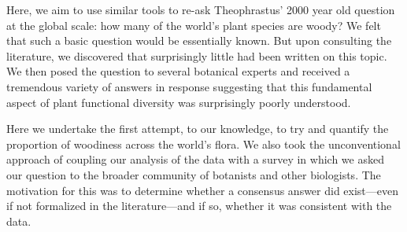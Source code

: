 \documentclass[12pt]{article}
\begin{document}
% 
Here, we aim to use similar tools to re-ask Theophrastus' 2000 year
old question at the global scale: how many of the world's plant
species are woody?
% 
We felt that such a basic question would be essentially known.  But
upon consulting the literature, we discovered that surprisingly little
had been written on this topic. We then posed the question to several
botanical experts and received a tremendous variety of answers in
response suggesting that this fundamental aspect of plant functional
diversity was surprisingly poorly understood. 

Here we undertake the first attempt, to our knowledge, to try and
quantify the proportion of woodiness across the world's flora. We also
took the unconventional approach of coupling our analysis of the data
with a survey in which we asked our question to the broader community
of botanists and other biologists. The motivation for this was to
determine whether a consensus answer did exist---even if not
formalized in the literature---and if so, whether it was consistent
with the data.


\end{document}
